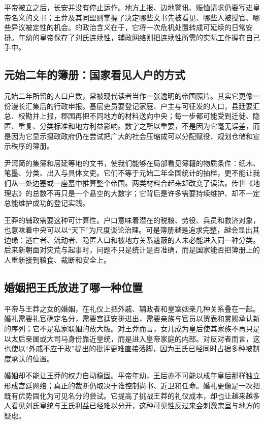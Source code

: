 平帝被立之后，长安并没有停止运作。地方上报、边地警讯、赈恤请求仍要写进皇帝名义的文书；王莽及其同盟则掌握了决定哪些文书先被看见、哪些人被授官、哪些异议被定性的机会。的政治含义在于，它将一次危机处置转成可延续的日常安排。年幼的皇帝保存了刘氏连续性，辅政网络则把连续性所需的实际工作握在自己手中。

\subsection{元始二年的簿册：国家看见人户的方式}

元始二年所留的人口户数，常被现代读者当作一张透明的帝国照片。其实它更像一份漫长汇集后的行政申报。基层吏员要登记家庭、户主与可征发的人口，县廷要汇总、校勘并上报，郡国再把不同地方的材料送向中央；每一步都可能受到迁徙、隐匿、重复、分类标准和地方利益影响。数字之所以重要，不是因为它毫无误差，而是因为它显示摄政政府仍在尝试把广大的社会压缩成可以分配赋役、规划仓储和宣示秩序的簿册。

尹湾简的集簿和居延等地的文书，使我们能够在局部看见簿籍的物质条件：纸木、笔墨、分类、出入与具体文吏。它们不等于元始二年全国统计的抽样，更不能让我们从一处边塞或一座墓中推算整个帝国。两类材料合起来却改变了读法。传世《地理志》的总数不再只是一个悬空的大数字；它背后是许多需要持续维护、却不一定总能维护成功的登记实践。

王莽的辅政需要这种可计算性。户口意味着潜在的税粮、劳役、兵员和救济对象，也意味着中央可以以“天下”为尺度谈论治理。可是簿册越是追求完整，越会显出其边缘：逃亡者、流动者、隐匿人口和被地方关系遮蔽的人未必能进入同一种分类。后来新朝面对灾荒与起事时，问题不只是统计是否准确，而是国家能否把簿册上的人重新接到粮食、裁断和安全上。

\subsection{婚姻把王氏放进了哪一种位置}

平帝与王莽之女的婚姻，在礼仪上把外戚、辅政者和皇室姻亲几种关系叠在一起。婚礼需要礼官确定名分，需要宫廷安排进出，需要亲族与官员以贺表和赏赐承认新的序列；它不是私家联姻的放大版。对王莽而言，女儿成为皇后使其家族不再只是以太后亲属或大司马身份靠近皇统，而是进入皇帝家庭的内部。对反对者而言，这也使以“外戚不应干政”提出的批评更难直接落脚，因为王氏已经同时占据多种被制度承认的位置。

婚姻却不能让王莽的权力自动稳固。平帝年幼，王后亦不可能以成年皇后那样独立形成宫廷网络；真正的裁断仍取决于谁控制尚书、近卫和任命。婚礼更像是一次把既有优势固化为可见名分的尝试。它提高了挑战王莽的礼仪成本，却也让越来越多人看见刘氏皇统与王氏利益已经难以分开，这种可见性反过来会刺激宗室与地方的疑虑。

